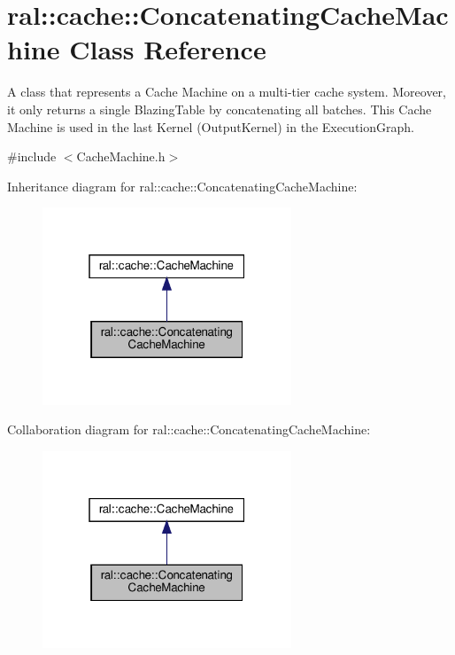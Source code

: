 \hypertarget{classral_1_1cache_1_1ConcatenatingCacheMachine}{}\section{ral\+:\+:cache\+:\+:Concatenating\+Cache\+Machine Class Reference}
\label{classral_1_1cache_1_1ConcatenatingCacheMachine}


A class that represents a Cache Machine on a multi-\/tier cache system. Moreover, it only returns a single Blazing\+Table by concatenating all batches. This Cache Machine is used in the last Kernel (Output\+Kernel) in the Execution\+Graph.  




{\ttfamily \#include $<$Cache\+Machine.\+h$>$}



Inheritance diagram for ral\+:\+:cache\+:\+:Concatenating\+Cache\+Machine\+:\nopagebreak
\begin{figure}[H]
\begin{center}
\leavevmode
\includegraphics[width=211pt]{classral_1_1cache_1_1ConcatenatingCacheMachine__inherit__graph}
\end{center}
\end{figure}


Collaboration diagram for ral\+:\+:cache\+:\+:Concatenating\+Cache\+Machine\+:\nopagebreak
\begin{figure}[H]
\begin{center}
\leavevmode
\includegraphics[width=211pt]{classral_1_1cache_1_1ConcatenatingCacheMachine__coll__graph}
\end{center}
\end{figure}
